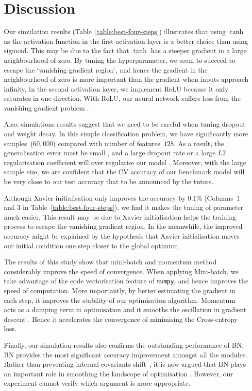 \section{Discussion}

Our simulation results (Table~\ref{table:best-four-steps}) illustrates that using $\tanh$ as the activation function in the first activation layer is a better choice than using sigmoid. This may be due to the fact that $\tanh$ has a steeper gradient in a large neighbourhood of zero. By tuning the hyperparameter, we seem to succeed to escape the `vanishing gradient region', and hence the gradient in the neighbourhood of zero is more important than the gradient when inputs approach infinity. In the second activation layer, we implement ReLU because it only saturates in one direction. With ReLU, our neural network suffers less from the vanishing gradient problem \citep{pmlr-v9-glorot10a}.

Also, simulations results suggest that we need to be careful when tuning dropout and weight decay. In this simple classification problem, we have significantly more samples~($60,000$) compared with number of  features~$128$. As a result, the generalisation error must be small \citep{james2013introduction}, and a large dropout rate or a large $L2$ regularisation coefficient will over regularise our model \citep{hastie01statisticallearning}. Moreover, with the large sample size, we are confident that the CV accuracy of our benchmark model will be very close to our test accuracy that to be announced by the tutors.

Although Xavier initialisation only improves the accuracy by $0.1\%$ (Columns~1 and 3 in Table~\ref{table:best-four-steps}), we find it makes the tuning of parameter much easier. This result may be due to Xavier initialisation helps the training process to escape the vanishing gradient region. In the meanwhile, the improved accuracy might be explained by the hypothesis that Xavier initialisation moves our initial condition one step closer to the global optimum.

The results of this study show that mini-batch and momentum method considerably improve the speed of convergence. When applying Mini-batch, we take advantage of the code vectorisation feature of \texttt{numpy}, and hence improves the speed of computation. More importantly, by better estimating the gradient in each step, it improves the stability of our optimisation algorithm. Momentum acts as a damping term in optimisation and it smooths the oscillation in gradient descent \citep{goh2017why}. Hence it accelerates the convergence of minimising the Cross-entropy loss.

Finally, our simulation results also confirms the outstanding performance of BN. BN provides the most significant accuracy improvement amongst all the modules. Rather than preventing internal covariants shift~\citep{pmlr-v37-ioffe15}, it is now argued that BN plays an important role in smoothing the landscope of optimisation \citep{NIPS20187515}. However, our experiment cannot verify which argument is more appropriate.